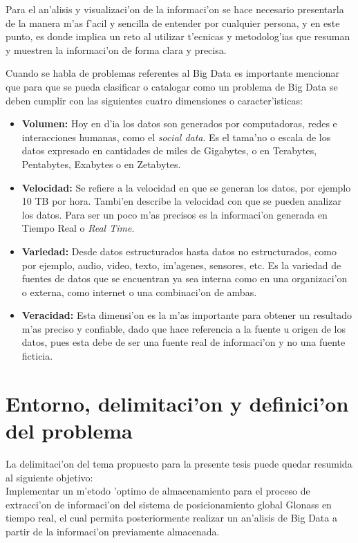 Para el an'alisis y visualizaci'on de la informaci'on se hace necesario presentarla de la manera m'as f'acil y sencilla de entender por cualquier persona, y en este punto, es donde implica un reto al utilizar t'ecnicas y metodolog'ias que resuman y muestren la informaci'on de forma clara y precisa.

Cuando se habla de problemas referentes al Big Data es importante mencionar que para que se pueda clasificar o catalogar como un problema de Big Data se deben cumplir con las siguientes cuatro dimensiones o caracter'isticas:

\begin{itemize}
\item\textbf{ Volumen:} Hoy en d'ia los datos son generados por computadoras, redes e interacciones humanas, como el \emph{social data}. Es el tama'no o escala de los datos expresado en cantidades de miles de Gigabytes, o en Terabytes, Pentabytes, Exabytes o en Zetabytes.

\item \textbf{Velocidad:} Se refiere a la velocidad en que se generan los datos, por ejemplo 10 TB por hora. Tambi'en describe la velocidad con que se pueden analizar los datos. Para ser un poco m'as precisos es la informaci'on generada en Tiempo Real o \emph{Real Time}.

\item \textbf{Variedad:} Desde datos estructurados hasta datos no estructurados, como por ejemplo, audio, video, texto, im'agenes, sensores, etc. Es la variedad de fuentes de datos que se encuentran ya sea interna como en una organizaci'on o externa, como internet o una combinaci'on de ambas.

\item \textbf{Veracidad:} Esta dimensi'on es la m'as importante para obtener un resultado m'as preciso y confiable, dado que hace referencia a la fuente u origen de los datos, pues esta debe de ser una fuente real de informaci'on y no una fuente ficticia. 
\end{itemize}

\section{Entorno, delimitaci'on y definici'on del problema}
\noindent
La  delimitaci'on  del  tema  propuesto  para  la  presente  tesis  puede  quedar  resumida  al  siguiente objetivo:\\

Implementar un m'etodo 'optimo de almacenamiento para el proceso de extracci'on de informaci'on del sistema de posicionamiento global Glonass en tiempo real, el cual permita posteriormente realizar un an'alisis de Big Data a partir de la informaci'on previamente almacenada.\\

